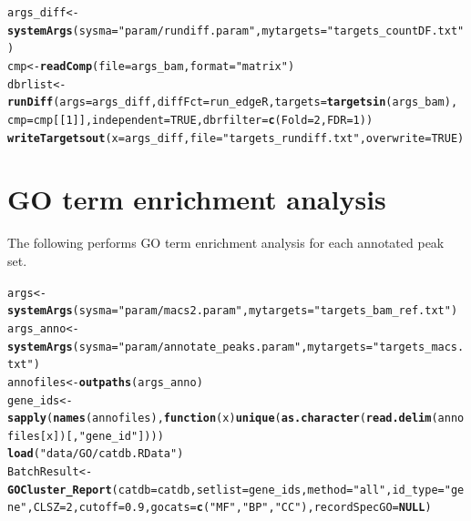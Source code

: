 \documentclass{article}\usepackage[]{graphicx}\usepackage[]{color}
\makeatletter
\newcommand{\hlnum}[1]{\textcolor[rgb]{0.686,0.059,0.569}{#1}}%
\newcommand{\hlstr}[1]{\textcolor[rgb]{0.192,0.494,0.8}{#1}}%
\newcommand{\hlstd}[1]{\textcolor[rgb]{0.345,0.345,0.345}{#1}}%
\newcommand{\hlkwa}[1]{\textcolor[rgb]{0.161,0.373,0.58}{\textbf{#1}}}%
\newcommand{\hlkwb}[1]{\textcolor[rgb]{0.69,0.353,0.396}{#1}}%
\newcommand{\hlkwc}[1]{\textcolor[rgb]{0.333,0.667,0.333}{#1}}%
\newcommand{\hlkwd}[1]{\textcolor[rgb]{0.737,0.353,0.396}{\textbf{#1}}}%
\newenvironment{kframe}{%
 \def\at@end@of@kframe{}%
 \ifinner\ifhmode%
  \def\at@end@of@kframe{\end{minipage}}%
  \begin{minipage}{\columnwidth}%
 \fi\fi%
 \def\FrameCommand##1{\hskip\@totalleftmargin \hskip-\fboxsep
 \colorbox{shadecolor}{##1}\hskip-\fboxsep
     \hskip-\linewidth \hskip-\@totalleftmargin \hskip\columnwidth}%
 \MakeFramed {\advance\hsize-\width
   \@totalleftmargin\z@ \linewidth\hsize
   \@setminipage}}%
 {\par\unskip\endMakeFramed%
 \at@end@of@kframe}
\newenvironment{knitrout}{}{} %
\makeatother
\begin{document}
\begin{knitrout}
\color{fgcolor}\begin{kframe}
\begin{alltt}
\hlstd{args_diff} \hlkwb{<-} \hlkwd{systemArgs}\hlstd{(}\hlkwc{sysma}\hlstd{=}\hlstr{"param/rundiff.param"}\hlstd{,} \hlkwc{mytargets}\hlstd{=}\hlstr{"targets_countDF.txt"}\hlstd{)}
\hlstd{cmp} \hlkwb{<-} \hlkwd{readComp}\hlstd{(}\hlkwc{file}\hlstd{=args_bam,} \hlkwc{format}\hlstd{=}\hlstr{"matrix"}\hlstd{)}
\hlstd{dbrlist} \hlkwb{<-} \hlkwd{runDiff}\hlstd{(}\hlkwc{args}\hlstd{=args_diff,} \hlkwc{diffFct}\hlstd{=run_edgeR,} \hlkwc{targets}\hlstd{=}\hlkwd{targetsin}\hlstd{(args_bam),}
                    \hlkwc{cmp}\hlstd{=cmp[[}\hlnum{1}\hlstd{]],} \hlkwc{independent}\hlstd{=}\hlnum{TRUE}\hlstd{,} \hlkwc{dbrfilter}\hlstd{=}\hlkwd{c}\hlstd{(}\hlkwc{Fold}\hlstd{=}\hlnum{2}\hlstd{,} \hlkwc{FDR}\hlstd{=}\hlnum{1}\hlstd{))}
\hlkwd{writeTargetsout}\hlstd{(}\hlkwc{x}\hlstd{=args_diff,} \hlkwc{file}\hlstd{=}\hlstr{"targets_rundiff.txt"}\hlstd{,} \hlkwc{overwrite}\hlstd{=}\hlnum{TRUE}\hlstd{)}
\end{alltt}
\end{kframe}
\end{knitrout}

\section{GO term enrichment analysis}
The following performs GO term enrichment analysis for each annotated peak set. 
\begin{knitrout}
\color{fgcolor}\begin{kframe}
\begin{alltt}
\hlstd{args} \hlkwb{<-} \hlkwd{systemArgs}\hlstd{(}\hlkwc{sysma}\hlstd{=}\hlstr{"param/macs2.param"}\hlstd{,} \hlkwc{mytargets}\hlstd{=}\hlstr{"targets_bam_ref.txt"}\hlstd{)}
\hlstd{args_anno} \hlkwb{<-} \hlkwd{systemArgs}\hlstd{(}\hlkwc{sysma}\hlstd{=}\hlstr{"param/annotate_peaks.param"}\hlstd{,} \hlkwc{mytargets}\hlstd{=}\hlstr{"targets_macs.txt"}\hlstd{)}
\hlstd{annofiles} \hlkwb{<-} \hlkwd{outpaths}\hlstd{(args_anno)}
\hlstd{gene_ids} \hlkwb{<-} \hlkwd{sapply}\hlstd{(}\hlkwd{names}\hlstd{(annofiles),} \hlkwa{function}\hlstd{(}\hlkwc{x}\hlstd{)} \hlkwd{unique}\hlstd{(}\hlkwd{as.character}\hlstd{(}\hlkwd{read.delim}\hlstd{(annofiles[x])[,}\hlstr{"gene_id"}\hlstd{])))}
\hlkwd{load}\hlstd{(}\hlstr{"data/GO/catdb.RData"}\hlstd{)}
\hlstd{BatchResult} \hlkwb{<-} \hlkwd{GOCluster_Report}\hlstd{(}\hlkwc{catdb}\hlstd{=catdb,} \hlkwc{setlist}\hlstd{=gene_ids,} \hlkwc{method}\hlstd{=}\hlstr{"all"}\hlstd{,} \hlkwc{id_type}\hlstd{=}\hlstr{"gene"}\hlstd{,} \hlkwc{CLSZ}\hlstd{=}\hlnum{2}\hlstd{,} \hlkwc{cutoff}\hlstd{=}\hlnum{0.9}\hlstd{,} \hlkwc{gocats}\hlstd{=}\hlkwd{c}\hlstd{(}\hlstr{"MF"}\hlstd{,} \hlstr{"BP"}\hlstd{,} \hlstr{"CC"}\hlstd{),} \hlkwc{recordSpecGO}\hlstd{=}\hlkwa{NULL}\hlstd{)}
\end{alltt}
\end{kframe}
\end{knitrout}
\end{document}
